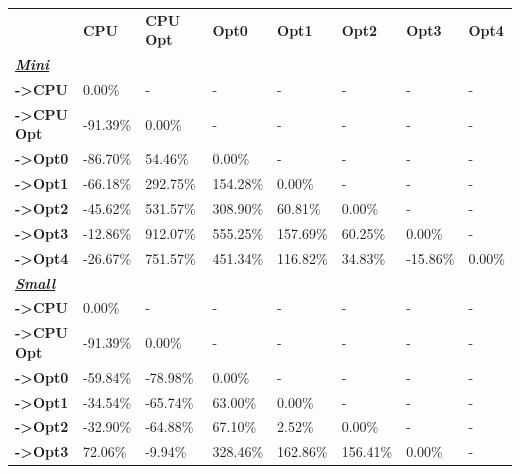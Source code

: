 \begin{table}[H]
    \centering
    \begin{tabular}{llllllll}
    \rowcolor[HTML]{DAE8FC} \ &  \textbf{CPU} &  \textbf{CPU Opt} &  \textbf{Opt0} &  \textbf{Opt1} &  \textbf{Opt2} &  \textbf{Opt3} &  \textbf{Opt4} \\
    \cellcolor[HTML]{DAE8FC} \textbf{\textbf{{\emph{{\underline{{Mini}}}}}}} &  &  &  &  &  &  &  \\
    \rowcolor[HTML]{EFEFEF} \cellcolor[HTML]{DAE8FC} \textbf{->CPU} & 0.00\% & - & - & - & - & - & - \\
    \cellcolor[HTML]{DAE8FC} \textbf{->CPU Opt} & -91.39\% & 0.00\% & - & - & - & - & - \\
    \rowcolor[HTML]{EFEFEF} \cellcolor[HTML]{DAE8FC} \textbf{->Opt0} & -86.70\% & 54.46\% & 0.00\% & - & - & - & - \\
    \cellcolor[HTML]{DAE8FC} \textbf{->Opt1} & -66.18\% & 292.75\% & 154.28\% & 0.00\% & - & - & - \\
    \rowcolor[HTML]{EFEFEF} \cellcolor[HTML]{DAE8FC} \textbf{->Opt2} & -45.62\% & 531.57\% & 308.90\% & 60.81\% & 0.00\% & - & - \\
    \cellcolor[HTML]{DAE8FC} \textbf{->Opt3} & -12.86\% & 912.07\% & 555.25\% & 157.69\% & 60.25\% & 	0.00\% & - \\
    \rowcolor[HTML]{EFEFEF} \cellcolor[HTML]{DAE8FC} \textbf{->Opt4} & -26.67\% & 751.57\% & 451.34\% & 116.82\% & 34.83\% & 	-15.86\% & 	0.00\% \\
    \cellcolor[HTML]{DAE8FC} \textbf{\textbf{{\emph{{\underline{{Small}}}}}}} &  &  &  &  &  &  &  \\
    \rowcolor[HTML]{EFEFEF} \cellcolor[HTML]{DAE8FC} \textbf{->CPU} & 0.00\% & - & - & - & - & - & - \\
    \cellcolor[HTML]{DAE8FC} \textbf{->CPU Opt} & -91.39\% & 0.00\% & - & - & - & - & - \\
    \rowcolor[HTML]{EFEFEF} \cellcolor[HTML]{DAE8FC} \textbf{->Opt0} & -59.84\% & -78.98\% & 0.00\% & - & - & - & - \\
    \cellcolor[HTML]{DAE8FC} \textbf{->Opt1} & -34.54\% & -65.74\% & 63.00\% & 0.00\% & - & - & - \\
    \rowcolor[HTML]{EFEFEF} \cellcolor[HTML]{DAE8FC} \textbf{->Opt2} & -32.90\% & -64.88\% & 67.10\% & 2.52\% & 0.00\% & - & - \\
    \cellcolor[HTML]{DAE8FC} \textbf{->Opt3} & 72.06\% & -9.94\% & 328.46\% & 162.86\% & 156.41\% & 	0.00\% & - \\

\end{tabular}
\end{table}
